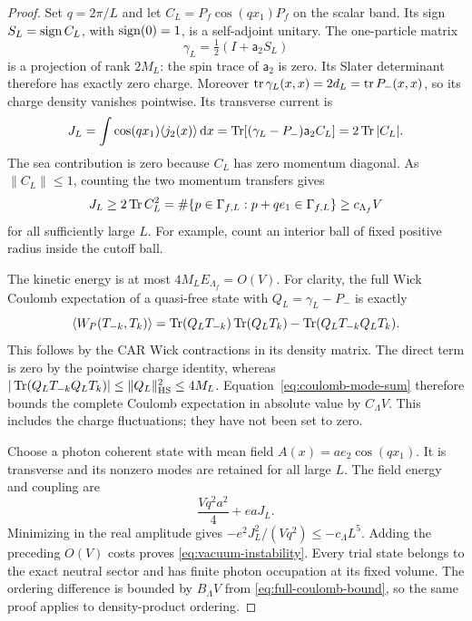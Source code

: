 \begin{proof}
Set $q=2\pi/L$ and let $C_L=P_f\cos(qx_1)P_f$ on the scalar band.
Its sign $S_L=\operatorname{sign} C_L$, with $\operatorname{sign}(0)=1$, is a self-adjoint
unitary. The one-particle matrix
\begin{equation}
 \gamma_L=\tfrac12(I+\mathsf a_2S_L)
 \label{b-L5-projector}
\end{equation}
is a projection of rank $2M_L$: the spin trace of $\mathsf a_2$
is zero. Its Slater determinant therefore has exactly zero charge.
Moreover $\operatorname{tr}\gamma_L(x,x)=2d_L=\operatorname{tr} P_-(x,x)$, so its charge
density vanishes pointwise. Its transverse current is
\[
 J_L=\int\cos(qx_1)\langle j_2(x)\rangle\,\mathrm d x
 =\operatorname{Tr}[(\gamma_L-P_-)\mathsf a_2C_L]=2\operatorname{Tr}|C_L|.
\]
The sea contribution is zero because $C_L$ has zero momentum diagonal.
As $\|C_L\|\le1$, counting the two momentum transfers gives
\[
 J_L\ge2\operatorname{Tr} C_L^2
 =\#\{p\in\Gamma_{f,L}:p+qe_1\in\Gamma_{f,L}\}
 \ge c_{\Lambda_f}V
\]
for all sufficiently large $L$. For example, count an interior ball
of fixed positive radius inside the cutoff ball.

The kinetic energy is at most $4M_LE_{\Lambda_f}=O(V)$.
For clarity, the full Wick Coulomb expectation of a quasi-free
state with $Q_L=\gamma_L-P_-$ is exactly
\begin{equation}
 \langle W_P(T_{-k},T_k)\rangle
 =\operatorname{Tr}(Q_LT_{-k})\operatorname{Tr}(Q_LT_k)
       -\operatorname{Tr}(Q_LT_{-k}Q_LT_k).
 \label{eq:trial-wick}
\end{equation}
This follows by the CAR Wick contractions in its density matrix.
The direct term is zero by the pointwise charge identity, whereas
$|\operatorname{Tr}(Q_LT_{-k}Q_LT_k)|\le\|Q_L\|_{\mathrm{HS}}^2\le4M_L$.
Equation~\eqref{eq:coulomb-mode-sum} therefore bounds the complete
Coulomb expectation in absolute value by $C_\Lambda V$.
This includes the charge fluctuations; they have not been set to zero.

Choose a photon coherent state with mean field
$A(x)=a e_2\cos(qx_1)$. It is transverse and its nonzero modes
are retained for all large $L$. The field energy and coupling are
\[
 \frac{Vq^2a^2}{4}+eaJ_L.
\]
Minimizing in the real amplitude gives
$-e^2J_L^2/(Vq^2)\le-c_\Lambda L^5$.
Adding the preceding $O(V)$ costs proves
\eqref{eq:vacuum-instability}. Every trial state belongs to the
exact neutral sector and has finite photon occupation at its fixed
volume. The ordering difference is bounded by $B_\Lambda V$ from
\eqref{eq:full-coulomb-bound}, so the same proof applies to
density-product ordering.
\end{proof}

